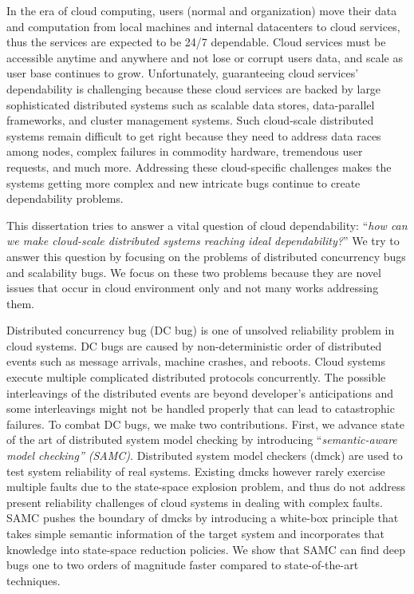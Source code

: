 In the era of cloud computing, users (normal and organization) move their data
and computation from local machines and internal datacenters to cloud services,
thus the services are expected to be 24/7 dependable. Cloud services must be
accessible anytime and anywhere and not lose or corrupt users data, and scale as
user base continues to grow.  Unfortunately, guaranteeing cloud services'
dependability is challenging because these cloud services are backed by large
sophisticated distributed systems such as scalable data stores, data-parallel
frameworks, and cluster management systems. Such cloud-scale distributed systems
remain difficult to get right because they need to address data races among
nodes, complex failures in commodity hardware, tremendous user requests, and
much more. Addressing these cloud-specific challenges makes the systems getting
more complex and new intricate bugs continue to create dependability problems.

This dissertation tries to answer a vital question of cloud dependability:
``{\em how can we make cloud-scale distributed systems reaching ideal
dependability?}'' We try to answer this question by focusing on the problems of
distributed concurrency bugs and scalability bugs. We focus on these two
problems because they are novel issues that occur in cloud environment only and
not many works addressing them.

Distributed concurrency bug (DC bug) is one of unsolved reliability problem in
cloud systems. DC bugs are caused by non-deterministic order of distributed
events such as message arrivals, machine crashes, and reboots. Cloud systems
execute multiple complicated distributed protocols concurrently. The possible
interleavings of the distributed events are beyond developer's anticipations and
some interleavings might not be handled properly that can lead to catastrophic
failures.
%
To combat DC bugs, we make two contributions. First, we advance state of the
art of distributed system model checking by introducing ``{\em semantic-aware
model checking'' (SAMC)}. Distributed system model checkers (dmck) are used to
test system reliability of real systems. Existing dmcks however rarely exercise
multiple faults due to the state-space explosion problem, and thus do not
address present reliability challenges of cloud systems in dealing with complex
faults. SAMC pushes the boundary of dmcks by introducing a white-box principle
that takes simple semantic information of the target system and incorporates
that knowledge into state-space reduction policies.  We show that SAMC can find
deep bugs one to two orders of magnitude faster compared to state-of-the-art
techniques. 

